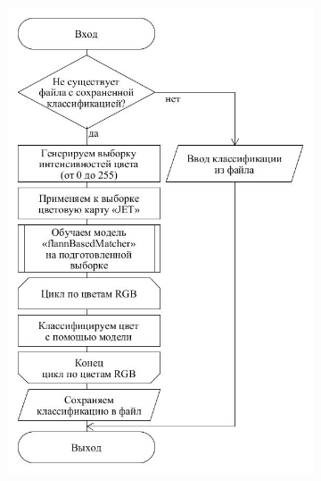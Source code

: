 \documentclass[14pt, a4paper]{extreport}
\begin{document}
	\begin{figure}[h!]
		\begin{subfigure}{.6\textwidth}
			\centering
			\includegraphics[width = \textwidth]{image/chapter_2/colorclassification}
			\caption{}
		\end{subfigure}
		\begin{subfigure}{.31\textwidth}
			\centering

\end{subfigure}
\end{figure}
\end{document}
